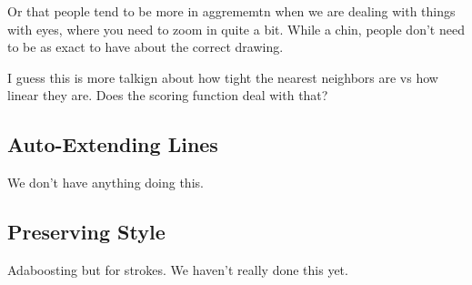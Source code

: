 Or that people tend to be more in aggrememtn when we are dealing with things with eyes, where you need to zoom in quite a bit. While a chin, people don't need to be as exact to have about the correct drawing. 

I guess this is more talkign about how tight the nearest neighbors are vs how linear they are. Does the scoring function deal with that?

\subsection{Auto-Extending Lines}
We don't have anything doing this.

\subsection{Preserving Style}
Adaboosting but for strokes. We haven't really done this yet.

